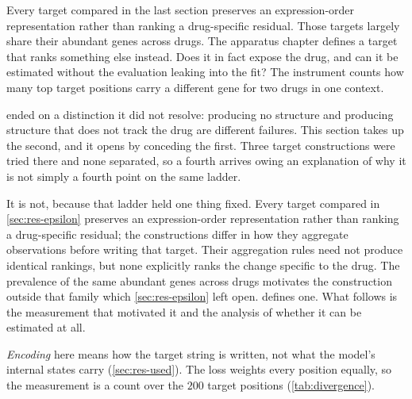 

\begin{question}[5]
  Every target compared in the last section preserves an expression-order
  representation rather than ranking a drug-specific residual. Those targets
  largely share their abundant genes across drugs. The apparatus chapter
  defines a target that ranks something else instead. Does it in fact expose the
  drug, and can it be estimated without the evaluation leaking into the fit? The
  instrument counts how many top target positions carry a different gene for two
  drugs in one context. 
  \end{question}

  \noindent
   ended on a distinction it did not resolve: producing no
  structure and producing structure that does not track the drug are different
  failures. This section takes up the second, and it opens by conceding the first.
  Three target constructions were tried there and none separated, so a fourth
  arrives owing an explanation of why it is not simply a fourth point on the same
  ladder.
  
  It is not, because that ladder held one thing fixed. Every target compared in
  \cref{sec:res-epsilon} preserves an expression-order representation rather than
  ranking a drug-specific residual; the constructions differ in how they
  aggregate observations before writing that target. Their aggregation rules
  need not produce identical rankings, but none explicitly ranks the change
  specific to the drug. The prevalence of the same abundant genes across drugs
  motivates the construction outside that family which
  \cref{sec:res-epsilon} left open.
   defines one. What follows is the measurement that
  motivated it and the analysis of whether it can be estimated at all.
  
  \emph{Encoding} here means how the target string is written, not what the model's
  internal states carry (\cref{sec:res-used}). The loss weights every position
  equally, so the measurement is a count over the $200$ target positions
  (\cref{tab:divergence}).
  
